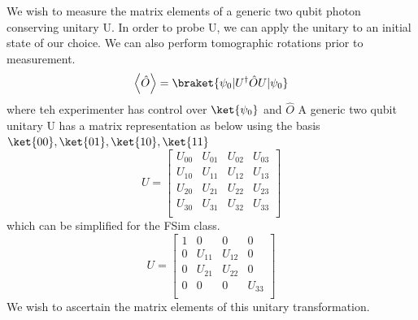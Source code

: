 We wish to measure the matrix elements of a generic two qubit photon conserving unitary U.
In order to probe U, we can apply the unitary to an initial state of our choice.  We can also perform tomographic rotations prior to measurement.
\begin{equation}
    \left< \hat{O} \right> = \braket{\psi_0 | U^{\dagger} \hat{O} U | \psi_0 }
\end{equation}
where teh experimenter has control over $\ket{\psi_0}$ and $\hat{O}$
A generic two qubit unitary U has a matrix representation as below using the basis $\ket{00}, \ket{01}, \ket{10}, \ket{11}$
\begin{equation}
    U =
    \begin{bmatrix}
        U_{00} & U_{01} & U_{02} & U_{03} \\
        U_{10} & U_{11} & U_{12} & U_{13} \\
        U_{20} & U_{21} & U_{22} & U_{23} \\
        U_{30} & U_{31} & U_{32} & U_{33} \\
    \end{bmatrix}
\end{equation}
which can be simplified for the FSim class.
\begin{equation}
    U=
    \begin{bmatrix}
        1 & 0 & 0 & 0 \\
        0 & U_{11} & U_{12} & 0 \\
        0 & U_{21} & U_{22} & 0 \\
        0 & 0 & 0 & U_{33} \\
    \end{bmatrix}
\end{equation}
We wish to ascertain the matrix elements of this unitary transformation.

